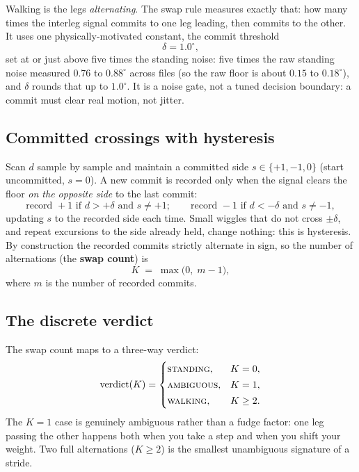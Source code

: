\documentclass[11pt]{article}
\newcommand{\ileg}{d}                   %
\newcommand{\degs}{^{\circ}}            %
\begin{document}
Walking is the legs \emph{alternating}. The swap rule measures exactly that: how many
times the interleg signal commits to one leg leading, then commits to the other. It
uses one physically-motivated constant, the commit threshold
\begin{equation}
\delta = 1.0\degs,
\end{equation}
set at or just above five times the standing noise: five times the raw standing noise
measured $0.76$ to $0.88\degs$ across files (so the raw floor is about $0.15$ to
$0.18\degs$), and $\delta$ rounds that up to $1.0\degs$. It is a noise gate, not a tuned
decision boundary: a commit must clear real motion, not jitter.

\subsection{Committed crossings with hysteresis}

Scan $\ileg$ sample by sample and maintain a committed side
$s \in \{+1, -1, 0\}$ (start uncommitted, $s=0$). A new commit is recorded only when
the signal clears the floor \emph{on the opposite side} to the last commit:
\begin{equation}
\text{record } +1 \text{ if } \ileg > +\delta \text{ and } s \neq +1;
\qquad
\text{record } -1 \text{ if } \ileg < -\delta \text{ and } s \neq -1,
\end{equation}
updating $s$ to the recorded side each time. Small wiggles that do not cross
$\pm\delta$, and repeat excursions to the side already held, change nothing: this is
hysteresis. By construction the recorded commits strictly alternate in sign, so the
number of alternations (the \textbf{swap count}) is
\begin{equation}
K \;=\; \max\!\big(0,\; m - 1\big),
\end{equation}
where $m$ is the number of recorded commits.

\subsection{The discrete verdict}

The swap count maps to a three-way verdict:
\begin{equation}
\text{verdict}(K) =
\begin{cases}
\textsc{standing}, & K = 0,\\[2pt]
\textsc{ambiguous}, & K = 1,\\[2pt]
\textsc{walking}, & K \geq 2.
\end{cases}
\label{eq:verdict}
\end{equation}
The $K=1$ case is genuinely ambiguous rather than a fudge factor: one leg passing the
other happens both when you take a step and when you shift your weight. Two full
alternations ($K \geq 2$) is the smallest unambiguous signature of a stride.
\end{document}
